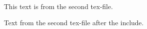 \documentclass[12pt,a4paper]{article}
\begin{document}
This text is from the second tex-file.


Text from the second tex-file after the include.
\end{document}
